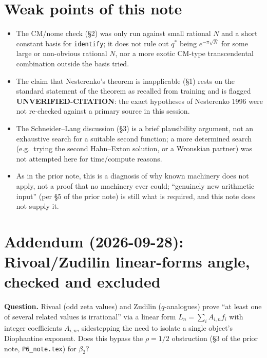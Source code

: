 \documentclass[11pt]{article}
\begin{document}
\section{Weak points of this note}

\begin{itemize}
\item The CM/nome check (\S2) was only run against small rational $N$ and a short constant
basis for \texttt{identify}; it does not rule out $q^\ast$ being $e^{-\pi\sqrt N}$ for some
large or non-obvious rational $N$, nor a more exotic CM-type transcendental combination outside
the basis tried.
\item The claim that Nesterenko's theorem is inapplicable (\S1) rests on the standard statement
of the theorem as recalled from training and is flagged \textbf{UNVERIFIED-CITATION}: the exact
hypotheses of Nesterenko 1996 were not re-checked against a primary source in this session.
\item The Schneider--Lang discussion (\S3) is a brief plausibility argument, not an exhaustive
search for a suitable second function; a more determined search (e.g.\ trying the second
Hahn--Exton solution, or a Wronskian partner) was not attempted here for time/compute reasons.
\item As in the prior note, this is a diagnosis of why known machinery does not apply, not a
proof that no machinery ever could; ``genuinely new arithmetic input'' (per \S5 of the prior
note) is still what is required, and this note does not supply it.
\end{itemize}

\section{Addendum (2026-09-28): Rivoal/Zudilin linear-forms angle, checked and excluded}

\textbf{Question.} Rivoal (odd zeta values) and Zudilin ($q$-analogues) prove ``at least one of
several related values is irrational'' via a linear form $L_n=\sum_i A_{i,n}f_i$ with integer
coefficients $A_{i,n}$, sidestepping the need to isolate a single object's Diophantine exponent.
Does this bypass the $\rho=1/2$ obstruction (\S3 of the prior note, \texttt{P6\_note.tex}) for
$\beta_2$?
\end{document}

